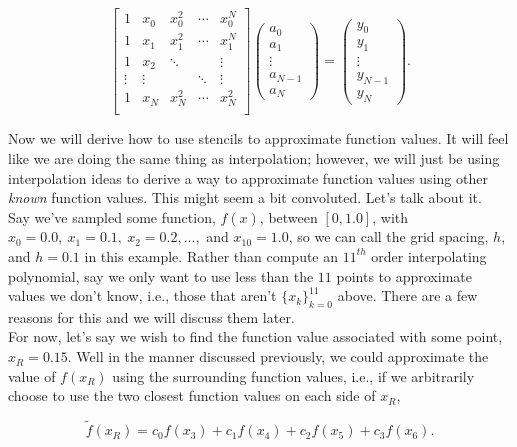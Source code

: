 \documentclass[paper=a4, fontsize=11pt]{scrartcl} %
\numberwithin{equation}{section} %
\numberwithin{figure}{section} %
\numberwithin{table}{section} %
\begin{document}
$$\left[ \begin{array}{ccccc}
1 & x_0 & x_0^2 & \cdots & x_0^N \\
1& x_1 & x_1^2 &  \cdots & x_1^N \\
1 & x_2 & \ddots &            & \vdots \\
\vdots & \vdots & & \ddots & \vdots \\
1 & x_N & x_N^2 & \cdots & x_N^2 \\ 
\end{array} \right] %
%
\left( \begin{array}{c}
a_{0} \\
a_{1} \\
\vdots \\
a_{N-1} \\
a_{N}
\end{array} \right) =  
%
\left( \begin{array}{c}
y_{0} \\
y_{1} \\
\vdots \\
y_{N-1} \\
y_{N}
\end{array} \right).$$

Now we will derive how to use stencils to approximate function values. It will feel like we are doing the same thing as interpolation; however, we will just be using interpolation ideas to derive a way to approximate function values using other \emph{known} function values. This might seem a bit convoluted. Let's talk about it.\\

Say we've sampled some function, $f(x)$, between $[0,1.0]$, with $x_0=0.0,\ x_1=0.1,\ x_2=0.2,...,$ and $x_{10}=1.0$, so we can call the grid spacing, $h$, and $h=0.1$ in this example. Rather than compute an $11^{th}$ order interpolating polynomial, say we only want to use less than the $11$ points to approximate values we don't know, i.e., those that aren't $\{x_k\}_{k=0}^{11}$ above. There are a few reasons for this and we will discuss them later. \\

For now, let's say we wish to find the function value associated with some point, $x_R=0.15$. Well in the manner discussed previously, we could approximate the value of $f(x_R)$ using the surrounding function values, i.e., if we arbitrarily choose to use the two closest function values on each side of $x_R$, 

$$\tilde{f}(x_R) = c_0 f(x_3) + c_1 f(x_4) + c_2 f(x_5) + c_3 f(x_6).$$
\end{document}
